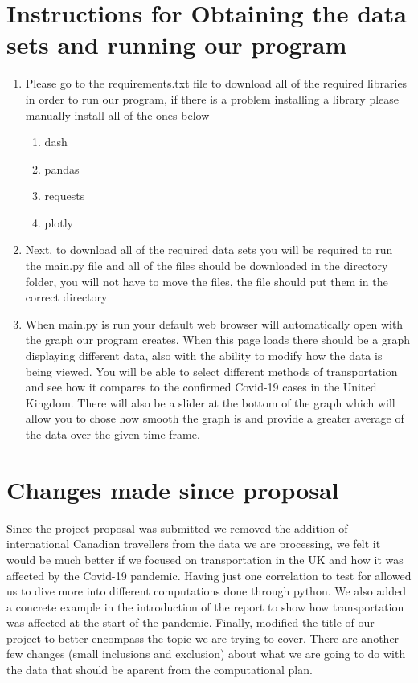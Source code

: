 \documentclass[fontsize=11pt]{article}
\begin{document}
\section*{Instructions for Obtaining the data sets and running our program}
\begin{enumerate}
    \item Please go to the requirements.txt file to download all of the required libraries in order to run our program, if there is a problem installing a library please manually install all of the ones below
    \begin{enumerate}
        \item dash
        \item pandas
        \item requests
        \item plotly
    \end{enumerate}
    \item Next, to download all of the required data sets you will be required to run the main.py file and all of the files should be downloaded in the directory folder, you will not have to move the files, the file should put them in the correct directory

    \item When main.py is run your default web browser will automatically open with the graph our program creates. When this page loads there should be a graph displaying different data, also with the ability to modify how the data is being viewed. You will be able to select different methods of transportation and see how it compares to the confirmed Covid-19 cases in the United Kingdom. There will also be a slider at the bottom of the graph which will allow you to chose how smooth the graph is and provide a greater average of the data over the given time frame.
\end{enumerate}

\section*{Changes made since proposal}
Since the project proposal was submitted we removed the addition of international Canadian travellers from the data we are processing, we felt it would be much better if we focused on transportation in the UK and how it was affected by the Covid-19 pandemic. Having just one correlation to test for allowed us to dive more into different computations done through python. We also added a concrete example in the introduction of the report to show how transportation was affected at the start of the pandemic. Finally, modified the title of our project to better encompass the topic we are trying to cover. There are another few changes (small inclusions and exclusion) about what we are going to do with the data that should be aparent from the computational plan.
\end{document}
